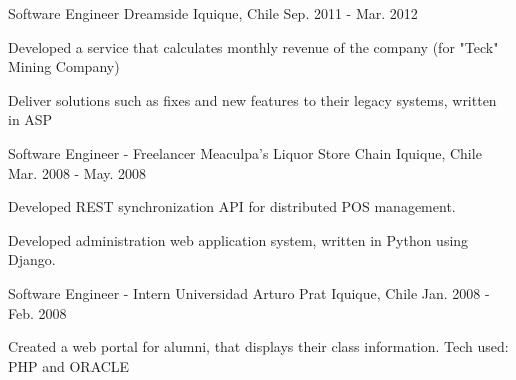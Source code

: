 \begin{cventries}
  \cventry
    {Software Engineer} %
    {Dreamside} %
    {Iquique, Chile} %
    {Sep. 2011 - Mar. 2012} %
    {
      \begin{cvitems} %
        \item {Developed a service that calculates monthly revenue of the company (for "Teck" Mining Company)}
        \item {Deliver solutions such as fixes and new features to their legacy systems, written in ASP}
      \end{cvitems}
    }

  \cventry
    {Software Engineer - Freelancer} %
    {Meaculpa's Liquor Store Chain} %
    {Iquique, Chile} %
    {Mar. 2008 - May. 2008} %
    {
      \begin{cvitems} %
        \item {Developed REST synchronization API for distributed POS management.}
        \item {Developed administration web application system, written in Python using Django.}
      \end{cvitems}
    }

  \cventry
    {Software Engineer - Intern} %
    {Universidad Arturo Prat} %
    {Iquique, Chile} %
    { Jan. 2008 - Feb. 2008} %
    {
      \begin{cvitems} %
        \item {Created a web portal for alumni, that displays their class information. Tech used: PHP and ORACLE }
      \end{cvitems}
    }

\end{cventries}
